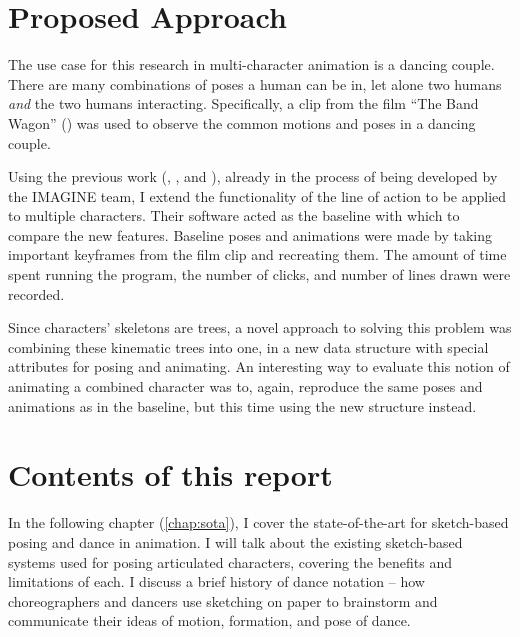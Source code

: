 \section{Proposed Approach}

The use case for this research in multi-character animation is a dancing couple. There are many combinations of poses a human can be in, let alone two humans \textit{and} the two humans interacting. Specifically, a clip from the film ``The Band Wagon'' (\citep{thebandwagon1953}) was used to observe the common motions and poses in a dancing couple.

Using the previous work (\citep{guay2013line}, \citep{guay2015adding}, and \citep{guay2015space}), already in the process of being developed by the IMAGINE team, I extend the functionality of the line of action to be applied to multiple characters. Their software acted as the baseline with which to compare the new features. Baseline poses and animations were made by taking important keyframes from the film clip and recreating them. The amount of time spent running the program, the number of clicks, and number of lines drawn were recorded.

Since characters' skeletons are trees, a novel approach to solving this problem was combining these kinematic trees into one, in a new data structure with special attributes for posing and animating. An interesting way to evaluate this notion of animating a combined character was to, again, reproduce the same poses and animations as in the baseline, but this time using the new structure instead.

\section{Contents of this report}

In the following chapter (\autoref{chap:sota}), I cover the state-of-the-art for sketch-based posing and dance in animation. I will talk about the existing sketch-based systems used for posing articulated characters, covering the benefits and limitations of each. I discuss a brief history of dance notation -- how choreographers and dancers use sketching on paper to brainstorm and communicate their ideas of motion, formation, and pose of dance.

